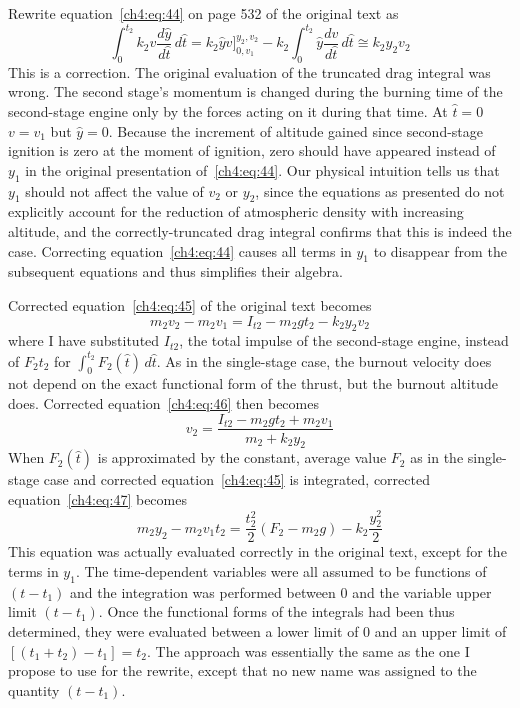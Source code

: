 Rewrite equation~\eqref{ch4:eq:44} on page 532 of the original text as
\begin{equation*}
\int_{0}^{t_2} k_2v\frac{d\hat{y}}{d\hat{t}}\,d\hat{t} = k_2\hat{y}v\Big]_{0,v_1}^{y_2,v_2}
  - k_2\int_{0}^{t_2}\hat{y}\frac{dv}{d\hat{t}}\,d\hat{t} \cong k_2y_2v_2
\end{equation*}
This is a correction. The original evaluation of the truncated drag integral was wrong. The second stage's
momentum is changed during the burning time of the second-stage engine only by the forces acting on it
during that time. At $\hat{t} = 0$ $v = v_1$ but $\hat{y} = 0$. Because the increment of altitude gained
since second-stage ignition is zero at the moment of ignition, zero should have appeared instead of $y_1$ in
the original presentation of~\eqref{ch4:eq:44}. Our physical intuition tells us that $y_1$ should not
affect the value of $v_2$ or $y_2$, since the equations as presented do not explicitly account for the
reduction of atmospheric density with increasing altitude, and the correctly-truncated drag integral
confirms that this is indeed the case. Correcting equation~\eqref{ch4:eq:44} causes all terms in $y_1$ to
disappear from the subsequent equations and thus simplifies their algebra.

Corrected equation~\eqref{ch4:eq:45} of the original text becomes
\begin{equation*}
m_2v_2 - m_2v_1 = I_{t2} - m_2gt_2 - k_2y_2v_2
\end{equation*}
where I have substituted $I_{t2}$, the total impulse of the second-stage engine, instead of $F_2t_2$ for
$\int_{0}^{t_2} F_2(\hat{t})\,d\hat{t}$. As in the single-stage case, the burnout velocity does not depend on
the exact functional form of the thrust, but the burnout altitude does. Corrected
equation~\eqref{ch4:eq:46} then becomes
\begin{equation*}
v_2 = \frac{I_{t2} - m_2gt_2 + m_2v_1}{m_2 + k_2y_2}
\end{equation*}
When $F_2(\hat{t})$ is approximated by the constant, average value $F_2$ as in the single-stage case and
corrected equation~\eqref{ch4:eq:45} is integrated, corrected equation~\eqref{ch4:eq:47} becomes
\begin{equation*}
m_2y_2 - m_2v_1t_2 = \frac{t_2^{2}}{2}(F_2 - m_2g) - k_2\frac{y_2^{2}}{2}
\end{equation*}
This equation was actually evaluated correctly in the original text, except for the terms in $y_1$. The
time-dependent variables were all assumed to be functions of $(t - t_1)$ and the integration was performed
between 0 and the variable upper limit $(t - t_1)$. Once the functional forms of the integrals had been thus
determined, they were evaluated between a lower limit of 0 and an upper limit of $[(t_1 + t_2) - t_1] =
t_2$. The approach was essentially the same as the one I propose to use for the rewrite, except that no new
name was assigned to the quantity $(t - t_1)$.


